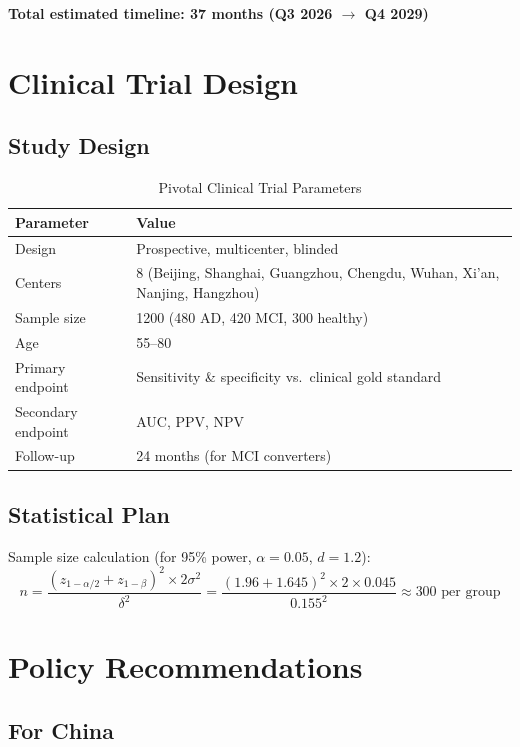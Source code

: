 \documentclass[12pt]{article}
\begin{document}
\textbf{Total estimated timeline: 37 months (Q3 2026 $\to$ Q4 2029)}

\section{Clinical Trial Design}
\label{sec:trial}

\subsection{Study Design}

\begin{table}[ht]
\centering
\caption{Pivotal Clinical Trial Parameters}
\label{tab:trial}
\begin{tabular}{ll}
\toprule
Parameter & Value \\
\midrule
Design & Prospective, multicenter, blinded \\
Centers & 8 (Beijing, Shanghai, Guangzhou, Chengdu, Wuhan, Xi'an, Nanjing, Hangzhou) \\
Sample size & 1200 (480 AD, 420 MCI, 300 healthy) \\
Age & 55--80 \\
Primary endpoint & Sensitivity \& specificity vs.\ clinical gold standard \\
Secondary endpoint & AUC, PPV, NPV \\
Follow-up & 24 months (for MCI converters) \\
\bottomrule
\end{tabular}
\end{table}

\subsection{Statistical Plan}

Sample size calculation (for 95\% power, $\alpha = 0.05$, $d = 1.2$):
\begin{equation}
n = \frac{(z_{1-\alpha/2} + z_{1-\beta})^2 \times 2\sigma^2}{\delta^2} = \frac{(1.96 + 1.645)^2 \times 2 \times 0.045}{0.155^2} \approx 300 \text{ per group}
\end{equation}

\section{Policy Recommendations}
\label{sec:policy}

\subsection{For China}
\end{document}
